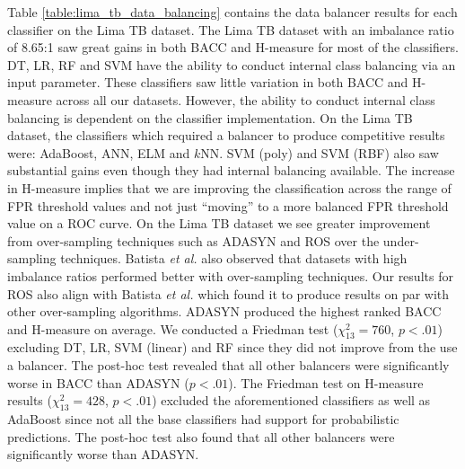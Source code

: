 \documentclass{sig-alternate-05-2015}
\begin{document}
	Table \ref{table:lima_tb_data_balancing} contains the data balancer results for each classifier on the Lima TB dataset. The Lima TB dataset with an imbalance ratio of 8.65:1 saw great gains in both BACC and H-measure for most of the classifiers. DT, LR, RF and SVM have the ability to conduct internal class balancing via an input parameter. These classifiers saw little variation in both BACC and H-measure across all our datasets. However, the ability to conduct internal class balancing is dependent on the classifier implementation. On the Lima TB dataset, the classifiers which required a balancer to produce competitive results were: AdaBoost, ANN, ELM and $k$NN. SVM (poly) and SVM (RBF) also saw substantial gains even though they had internal balancing available. The increase in H-measure implies that we are improving the classification across the range of FPR threshold values and not just ``moving'' to a more balanced FPR threshold value on a ROC curve. On the Lima TB dataset we see greater improvement from over-sampling techniques such as ADASYN and ROS over the under-sampling techniques. Batista \textit{et al.} \cite{Batista:2004:SBS:1007730.1007735} also observed that datasets with high imbalance ratios performed better with over-sampling techniques. Our results for ROS also align with Batista \textit{et al.} \cite{Batista:2004:SBS:1007730.1007735} which found it to produce results on par with other over-sampling algorithms. ADASYN produced the highest ranked BACC and H-measure on average.  We conducted a Friedman test ($\chi^2_{13}=760$, $p<.01$) excluding DT, LR, SVM (linear) and RF since they did not improve from the use a balancer. The post-hoc test revealed that all other balancers were significantly worse in BACC than ADASYN ($p<.01$). The Friedman test on H-measure results ($\chi^2_{13}=428$, $p<.01$) excluded the aforementioned classifiers as well as AdaBoost since not all the base classifiers had support for probabilistic predictions. The post-hoc test also found that all other balancers were significantly worse than ADASYN. 
	
\end{document}
